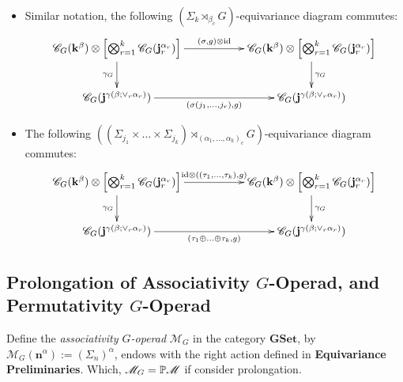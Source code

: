 \documentclass{article}
\begin{document}
\begin{defn}
\begin{itemize}
        \hfil

        \item[(d)] Similar notation, the following $(\Sigma_k\rtimes_{\beta_c}G)$-equivariance diagram commutes:
        \begin{align*}
            \xymatrix{
                \mathscr{C}_G(\mathbf{k}^\beta)\tensor\left[\bigtensor_{r=1}^k \mathscr{C}_G(\mathbf{j}_r^{\alpha_r})\right] \ar[d]_-{\gamma_G} \ar[rr]^-{(\sigma,g)\tensor \id} && \mathscr{C}_G(\mathbf{k}^\beta)\tensor\left[\bigtensor_{r=1}^k \mathscr{C}_G(\mathbf{j}_r^{\alpha_r})\right] \ar[d]^-{\gamma_G}\\
                \mathscr{C}_G(\mathbf{j}^{\gamma(\beta;\vee_r\alpha_r)}) \ar[rr]_-{(\sigma(j_1,...,j_r),g)} && \mathscr{C}_G(\mathbf{j}^{\gamma(\beta;\vee_r\alpha_r)})
            }
        \end{align*}

        \hfil

        \item[(e)] The following $\left(\left(\Sigma_{j_1}\times...\times \Sigma_{j_k}\right)\rtimes_{(\alpha_1,...,\alpha_k)_c}G\right)$-equivariance diagram commutes:
        \begin{align*}
            \xymatrix{
                \mathscr{C}_G(\mathbf{k}^\beta)\tensor\left[\bigtensor_{r=1}^k \mathscr{C}_G(\mathbf{j}_r^{\alpha_r})\right] \ar[d]_-{\gamma_G} \ar[rr]^-{\id\tensor ((\tau_1,...,\tau_k),g)} && \mathscr{C}_G(\mathbf{k}^\beta)\tensor\left[\bigtensor_{r=1}^k \mathscr{C}_G(\mathbf{j}_r^{\alpha_r})\right] \ar[d]^-{\gamma_G}\\
                \mathscr{C}_G(\mathbf{j}^{\gamma(\beta;\vee_r\alpha_r)}) \ar[rr]_-{(\tau_1\oplus ...\oplus \tau_k,g)} && \mathscr{C}_G(\mathbf{j}^{\gamma(\beta;\vee_r\alpha_r)})
            }
        \end{align*}
    \end{itemize}
\end{defn}

\newpage

\subsection{Prolongation of Associativity $G$-Operad, and Permutativity $G$-Operad}

\begin{defn}
    Define the \emph{associativity $G$-operad} $\mathscr{M}_G$ in the category $\mathbf{GSet}$, by $\mathscr{M}_G(\mathbf{n}^\alpha):= (\Sigma_n)^\alpha$, endows with the right action defined in \textbf{Equivariance Preliminaries}. Which, $\mathscr{M}_G = \mathbb{P}\mathscr{M}$ if consider prolongation.
\end{defn}
\end{document}
